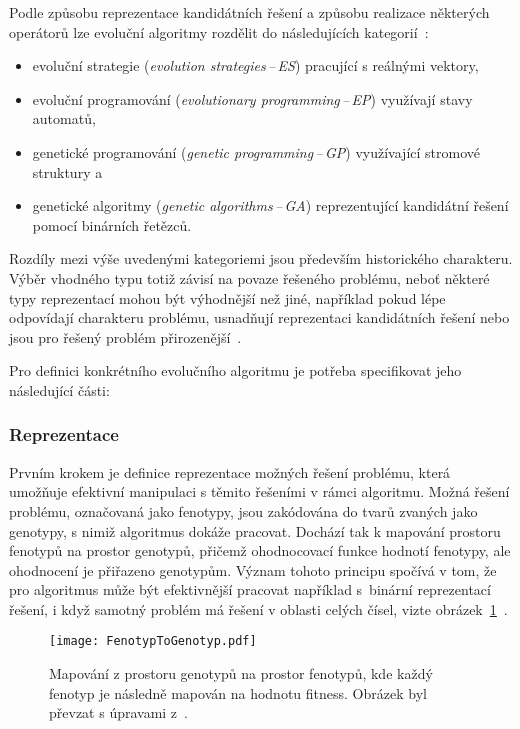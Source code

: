 Podle způsobu reprezentace kandidátních řešení a způsobu realizace některých operátorů lze evoluční algoritmy rozdělit do následujících kategorií~\cite{IntroductionToEvoComputing}:
\begin{itemize}
    \item evoluční strategie (\emph{evolution strategies\,--\,ES}) pracující s reálnými vektory,
    \item evoluční programování (\emph{evolutionary programming\,--\,EP}) využívají stavy automatů,
    \item genetické programování (\emph{genetic programming\,--\,GP}) využívající stromové struktury a
    \item genetické algoritmy (\emph{genetic algorithms\,--\,GA}) reprezentující kandidátní řešení pomocí binárních řetězců. 
\end{itemize}
Rozdíly mezi výše uvedenými kategoriemi jsou především historického charakteru. 
Výběr vhodného typu totiž závisí na povaze řešeného problému, neboť některé typy reprezentací mohou být výhodnější než jiné, například pokud lépe odpovídají charakteru problému, usnadňují reprezentaci kandidátních řešení nebo jsou pro řešený problém přirozenější~\cite{IntroductionToEvoComputing}. 

Pro definici konkrétního evolučního algoritmu je potřeba specifikovat jeho následující části:

\subsubsection*{Reprezentace}
Prvním krokem je definice reprezentace možných řešení problému, která umožňuje efektivní manipulaci s těmito řešeními v rámci algoritmu. 
Možná řešení problému, označovaná jako fenotypy, jsou zakódována do tvarů zvaných jako genotypy, s nimiž algoritmus dokáže pracovat. 
Dochází tak k mapování prostoru fenotypů na prostor genotypů, přičemž ohodnocovací funkce hodnotí fenotypy, ale ohodnocení je přiřazeno genotypům. 
Význam tohoto principu spočívá v tom, že pro algoritmus může být efektivnější pracovat například s~binární reprezentací řešení, i když samotný problém má řešení v oblasti celých čísel, vizte obrázek~\ref{fig:fenotyp-to-genotyp}~\cite{IntroductionToEvoComputing,NaturalComputing}. 
\begin{figure}[ht!]
    \centering
    \texttt{[image: FenotypToGenotyp.pdf]}
    \caption{Mapování z prostoru genotypů na prostor fenotypů, kde každý fenotyp je následně mapován na hodnotu fitness. Obrázek byl převzat s úpravami z~\cite{NaturalComputing}.}
    \label{fig:fenotyp-to-genotyp}
\end{figure}

